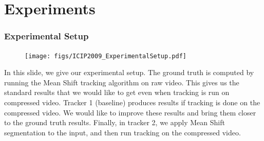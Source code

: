 \section{Experiments}

\begin{frame}
\frametitle{Experimental Setup} 
\logoCSIPCPL\mypagenum
{}
{
	\begin{figure}
		\texttt{[image: figs/ICIP2009\_ExperimentalSetup.pdf]}
	\end{figure}
}
{
In this slide, we give our experimental setup.  The ground truth is computed by running the Mean Shift tracking algorithm on raw video.  This gives us the standard results that we would like to get even when tracking is run on compressed video.  Tracker 1 (baseline) produces results if tracking is done on the compressed video.  We would like to improve these results and bring them closer to the ground truth results.  Finally, in tracker 2, we apply Mean Shift segmentation to the input, and then run tracking on the compressed video.
}
\end{frame}



